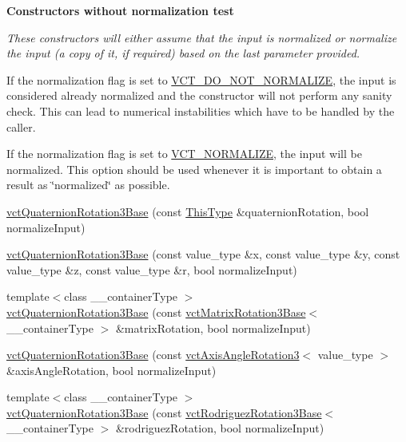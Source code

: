 \begin{Indent}{\bf Constructors without normalization test}\par
{\em These constructors will either assume that the input is normalized or normalize the input (a copy of it, if required) based on the last parameter provided.


\begin{DoxyItemize}
\item If the normalization flag is set to \hyperlink{vct_forward_declarations_8h_a6fd516b0c35fa9967b4da5f03a788985}{V\-C\-T\-\_\-\-D\-O\-\_\-\-N\-O\-T\-\_\-\-N\-O\-R\-M\-A\-L\-I\-Z\-E}, the input is considered already normalized and the constructor will not perform any sanity check. This can lead to numerical instabilities which have to be handled by the caller.


\item If the normalization flag is set to \hyperlink{vct_forward_declarations_8h_ae54c682b919a7c5743ea498810518565}{V\-C\-T\-\_\-\-N\-O\-R\-M\-A\-L\-I\-Z\-E}, the input will be normalized. This option should be used whenever it is important to obtain a result as \char`\"{}normalized\char`\"{} as possible.


\end{DoxyItemize}}\begin{DoxyCompactItemize}
\item 
\hyperlink{classvct_quaternion_rotation3_base_ae8f0b3b79b368f80ea333f2bff792e79}{vct\-Quaternion\-Rotation3\-Base} (const \hyperlink{classvct_quaternion_base_af28efdc38acf89acb7a67afada11408c}{This\-Type} \&quaternion\-Rotation, bool normalize\-Input)
\item 
\hyperlink{classvct_quaternion_rotation3_base_a07d0b2ed8314011b0bb68f195df0fbef}{vct\-Quaternion\-Rotation3\-Base} (const value\-\_\-type \&x, const value\-\_\-type \&y, const value\-\_\-type \&z, const value\-\_\-type \&r, bool normalize\-Input)
\item 
{\footnotesize template$<$class \-\_\-\-\_\-container\-Type $>$ }\\\hyperlink{classvct_quaternion_rotation3_base_ac9035beb866ddfa729366b5098dab49d}{vct\-Quaternion\-Rotation3\-Base} (const \hyperlink{classvct_matrix_rotation3_base}{vct\-Matrix\-Rotation3\-Base}$<$ \-\_\-\-\_\-container\-Type $>$ \&matrix\-Rotation, bool normalize\-Input)
\item 
\hyperlink{classvct_quaternion_rotation3_base_a4dc7f240e97a06c7b8bac87b0aa7ed11}{vct\-Quaternion\-Rotation3\-Base} (const \hyperlink{classvct_axis_angle_rotation3}{vct\-Axis\-Angle\-Rotation3}$<$ value\-\_\-type $>$ \&axis\-Angle\-Rotation, bool normalize\-Input)
\item 
{\footnotesize template$<$class \-\_\-\-\_\-container\-Type $>$ }\\\hyperlink{classvct_quaternion_rotation3_base_af05d7939df2800a9a541ed9bac3698e0}{vct\-Quaternion\-Rotation3\-Base} (const \hyperlink{classvct_rodriguez_rotation3_base}{vct\-Rodriguez\-Rotation3\-Base}$<$ \-\_\-\-\_\-container\-Type $>$ \&rodriguez\-Rotation, bool normalize\-Input)
\end{DoxyCompactItemize}
\end{Indent}
